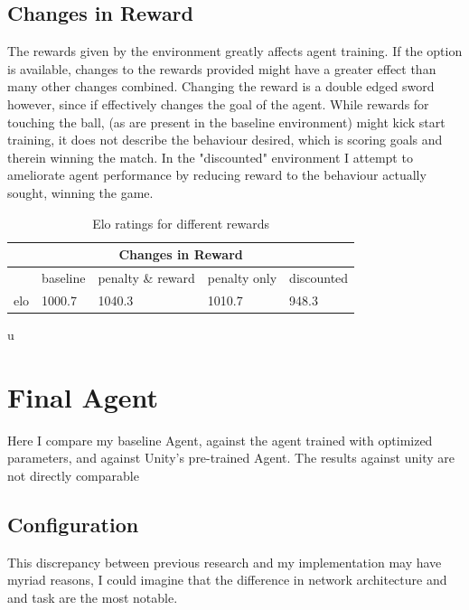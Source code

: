 \subsection{Changes in Reward}\label{subsec:tr:alg}

The rewards given by the environment greatly affects agent training. If the option is available, changes to the rewards provided might have a greater effect than many other changes combined. Changing the reward is a double edged sword however, since if effectively changes the goal of the agent. While rewards for touching the ball, (as are present in the baseline environment) might kick start training, it does not describe the behaviour desired, which is scoring goals and therein winning the match. 
In the "discounted" environment I attempt to ameliorate agent performance by reducing reward to the behaviour actually sought, winning the game. 

\begin{table}[H]
    \begin{center}
    \begin{tabular}{ |l|l|l|l|l| }
        \hline
        \multicolumn{5}{|c|}{Changes in Reward}\\
        \hline
        \hline
         & baseline & penalty \& reward & penalty only & discounted \\
        \hline
        elo & 1000.7 & 1040.3 & 1010.7 & 948.3 \\ 
        \hline
    \end{tabular}
    \end{center}u
    \caption{Elo ratings for different rewards}
    \label{tab:my_label}
\end{table}


\section{Final Agent}
Here I compare my baseline Agent, against the agent trained with optimized parameters, and against Unity's pre-trained Agent. The results against unity are not directly comparable 

\subsection{Configuration}
This discrepancy between previous research and my implementation may have myriad reasons, I could imagine that the difference in network architecture and and task are the most notable. 

